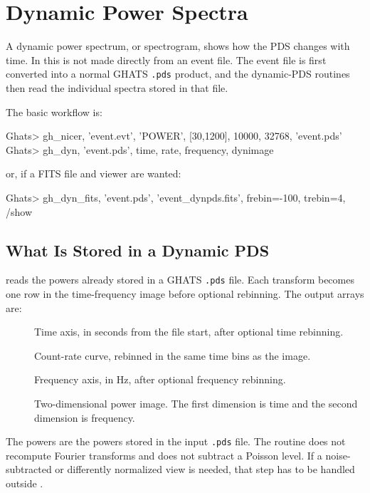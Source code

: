 \chapter{Dynamic Power Spectra}
\label{chap:dynamic-pds}

A dynamic power spectrum, or spectrogram, shows how the PDS changes with
time.  In \ghats{} this is not made directly from an event file.  The event
file is first converted into a normal GHATS \texttt{.pds} product, and the
dynamic-PDS routines then read the individual spectra stored in that file.

The basic workflow is:

\begin{ghatsconsole}
Ghats> gh_nicer, 'event.evt', 'POWER', [30,1200], 10000, 32768, 'event.pds'
Ghats> gh_dyn, 'event.pds', time, rate, frequency, dynimage
\end{ghatsconsole}

or, if a FITS file and viewer are wanted:

\begin{ghatsconsole}
Ghats> gh_dyn_fits, 'event.pds', 'event_dynpds.fits', frebin=-100, trebin=4, /show
\end{ghatsconsole}

\section{What Is Stored in a Dynamic PDS}

 reads the powers already stored in a GHATS \texttt{.pds}
file.  Each transform becomes one row in the time-frequency image before
optional rebinning.  The output arrays are:

\begin{description}
\item[] Time axis, in seconds from the file start, after optional
  time rebinning.
\item[] Count-rate curve, rebinned in the same time bins as the
  image.
\item[] Frequency axis, in Hz, after optional frequency
  rebinning.
\item[] Two-dimensional power image.  The first dimension is
  time and the second dimension is frequency.
\end{description}

The powers are the powers stored in the input \texttt{.pds} file.  The
routine does not recompute Fourier transforms and does not subtract a Poisson
level.  If a noise-subtracted or differently normalized view is needed, that
step has to be handled outside .


